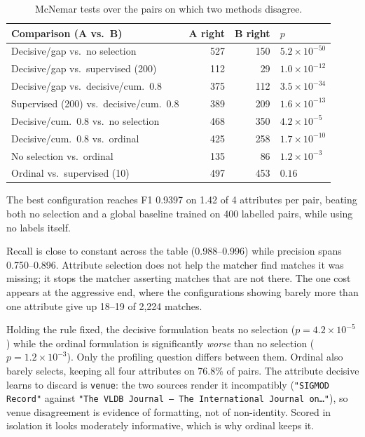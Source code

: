 \documentclass[11pt]{article}
\begin{document}
\begin{table}[h]
\centering
\begin{tabular}{lrrl}
\toprule
Comparison (A vs.\ B) & A right & B right & $p$ \\
\midrule
Decisive/gap vs.\ no selection            & 527 & 150 & $5.2\times10^{-50}$ \\
Decisive/gap vs.\ supervised (200)        & 112 &  29 & $1.0\times10^{-12}$ \\
Decisive/gap vs.\ decisive/cum.\ 0.8      & 375 & 112 & $3.5\times10^{-34}$ \\
Supervised (200) vs.\ decisive/cum.\ 0.8  & 389 & 209 & $1.6\times10^{-13}$ \\
Decisive/cum.\ 0.8 vs.\ no selection      & 468 & 350 & $4.2\times10^{-5}$ \\
Decisive/cum.\ 0.8 vs.\ ordinal           & 425 & 258 & $1.7\times10^{-10}$ \\
No selection vs.\ ordinal                 & 135 &  86 & $1.2\times10^{-3}$ \\
Ordinal vs.\ supervised (10)              & 497 & 453 & $0.16$ \\
\bottomrule
\end{tabular}
\caption{McNemar tests over the pairs on which two methods disagree.}
\end{table}

The best configuration reaches F1 0.9397 on 1.42 of 4 attributes per pair, beating both no
selection and a global baseline trained on 400 labelled pairs, while using no labels
itself.

Recall is close to constant across the table (0.988--0.996) while precision spans
0.750--0.896. Attribute selection does not help the matcher find matches it was missing; it
stops the matcher asserting matches that are not there. The one cost appears at the
aggressive end, where the configurations showing barely more than one attribute give up
18--19 of 2{,}224 matches.

Holding the rule fixed, the decisive formulation beats no selection
($p = 4.2\times10^{-5}$) while the ordinal formulation is significantly \emph{worse} than
no selection ($p = 1.2\times10^{-3}$). Only the profiling question differs between them.
Ordinal also barely selects, keeping all four attributes on 76.8\% of pairs. The attribute
decisive learns to discard is \texttt{venue}: the two sources render it incompatibly
(\texttt{"SIGMOD Record"} against \texttt{"The VLDB Journal --- The International Journal
on\ldots"}), so venue disagreement is evidence of formatting, not of non-identity. Scored in
isolation it looks moderately informative, which is why ordinal keeps it.
\end{document}
